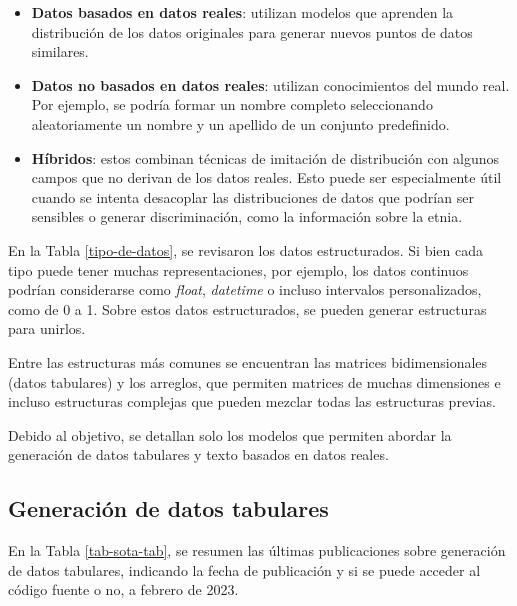 \begin{itemize}
    \item \textbf{Datos basados en datos reales}: utilizan modelos que aprenden la distribución de los datos originales para generar nuevos puntos de datos similares.
    \item \textbf{Datos no basados en datos reales}: utilizan conocimientos del mundo real. Por ejemplo, se podría formar un nombre completo seleccionando aleatoriamente un nombre y un apellido de un conjunto predefinido.
    \item \textbf{Híbridos}: estos combinan técnicas de imitación de distribución con algunos campos que no derivan de los datos reales. Esto puede ser especialmente útil cuando se intenta desacoplar las distribuciones de datos que podrían ser sensibles o generar discriminación, como la información sobre la etnia.
\end{itemize}
    
En la Tabla \ref{tipo-de-datos}, se revisaron los datos estructurados. Si bien cada tipo puede tener muchas representaciones, por ejemplo, los datos continuos podrían considerarse como \emph{float}, \emph{datetime} o incluso intervalos personalizados, como de 0 a 1. Sobre estos datos estructurados, se pueden generar estructuras para unirlos.

Entre las estructuras más comunes se encuentran las matrices bidimensionales (datos tabulares) y los arreglos, que permiten matrices de muchas dimensiones e incluso estructuras complejas que pueden mezclar todas las estructuras previas.

Debido al objetivo, se detallan solo los modelos que permiten abordar la generación de datos tabulares y texto basados en datos reales.
\subsection{Generación de datos tabulares}
En la Tabla \ref{tab-sota-tab}, se resumen las últimas publicaciones sobre generación de datos tabulares, indicando la fecha de publicación y si se puede acceder al código fuente o no, a febrero de 2023.


